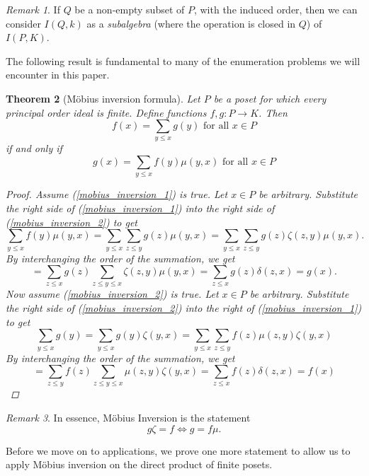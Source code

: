 \documentclass[psamsfonts]{amsart}
\newtheorem{thm}{Theorem}[section]
\theoremstyle{definition}
\theoremstyle{remark}
\newtheorem{rem}[thm]{Remark}
\numberwithin{equation}{section}
\begin{document}
\begin{rem}
If $Q$ be a non-empty subset of $P$, with the induced order, then we can consider $I(Q,k)$ as a \textit{subalgebra} (where the operation is closed in $Q$) of $I(P,K)$. 
\end{rem}

The following result is fundamental to many of the enumeration problems we will encounter in this paper.

\begin{thm} [M\"{o}bius inversion formula]
Let $P$ be a poset for which every principal order ideal is finite. Define functions $f,g:P\to K$. Then
\begin{equation}\label{mobius_inversion_1}
    f(x)=\sum_{y\leq x}g(y) \text{ for all $x\in P$}
\end{equation}
if and only if
\begin{equation}\label{mobius_inversion_2}
    g(x)=\sum_{y\leq x}f(y)\mu(y,x) \text{ for all $x\in P$}
\end{equation}
\begin{proof}
Assume (\ref{mobius_inversion_1}) is true. Let $x\in P$ be arbitrary. Substitute the right side of (\ref{mobius_inversion_1}) into the right side of (\ref{mobius_inversion_2}) to get
\[
\sum_{y\leq x}f(y)\mu(y,x) = \sum_{y\leq x}\sum_{z\leq y}g(z)\mu(y,x)=\sum_{y\leq x}\sum_{z\leq y}g(z)\zeta(z,y)\mu(y,x).
\]
By interchanging the order of the summation, we get
\[
=\sum_{z\leq x}g(z)\sum_{z\leq y\leq x}\zeta(z,y)\mu(y,x)=\sum_{z\leq x}g(z)\delta(z,x)=g(x).
\]
Now assume (\ref{mobius_inversion_2}) is true. Let $x\in P$ be arbitrary. Substitute the right side of (\ref{mobius_inversion_2}) into the right of (\ref{mobius_inversion_1}) to get
\[
\sum_{y\leq x}g(y)=\sum_{y\leq x}g(y)\zeta(y,x)=\sum_{y\leq x}\sum_{z\leq y}f(z)\mu(z,y)\zeta(y,x)
\]
By interchanging the order of the summation, we get
\[
=\sum_{z\leq y} f(z)\sum_{z\leq y\leq x}\mu(z,y)\zeta(y,x)=\sum_{z\leq x}f(z)\delta(z,x)=f(x)
\]
\end{proof}
\end{thm}
\begin{rem}
In essence, M\"{o}bius Inversion is the statement
\begin{equation}
    g\zeta=f\iff g=f\mu.
\end{equation}
\end{rem}

\indent Before we move on to applications, we prove one more statement to allow us to apply M\"{o}bius inversion on the direct product of finite posets.
\end{document}
